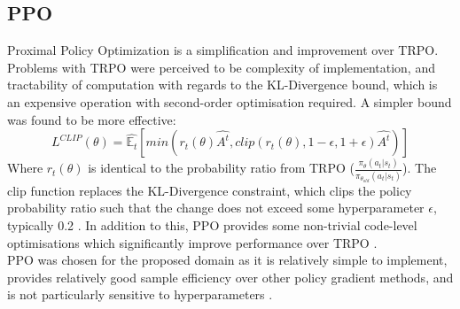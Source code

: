 \documentclass{article}
\begin{document}
\subsection{PPO}
Proximal Policy Optimization \citep{schulman2017proximal} is a simplification and improvement over TRPO. Problems with TRPO were perceived to be complexity of implementation, and tractability of computation with regards to the KL-Divergence bound, which is an expensive operation with second-order optimisation required. A simpler bound was found to be more effective:
\begin{equation} \label{ppoupdate}
      L^{CLIP}(\theta) =  \hat{\mathbb{E}_t}\left[min(r_t(\theta)\hat{A^t},clip(r_t(\theta),1-\epsilon,1+\epsilon)\hat{A^t})\right]
\end{equation}
Where $r_t(\theta)$ is identical to the probability ratio from TRPO ($\frac{\pi_\theta(a_t | s_t)}{\pi_{\theta_{old}}(a_t | s_t)}$). The clip function replaces the KL-Divergence constraint, which clips the policy probability ratio such that the change does not exceed some hyperparameter $\epsilon$, typically 0.2 \citep{schulman2017proximal}. In addition to this, PPO provides some non-trivial code-level optimisations which significantly improve performance over TRPO \citep{Engstrom2020Implementation}. \\\newline
PPO was chosen for the proposed domain as it is relatively simple to implement, provides relatively good sample efficiency over other policy gradient methods, and is not particularly sensitive to hyperparameters \citep{schulman2017proximal}.
\end{document}
